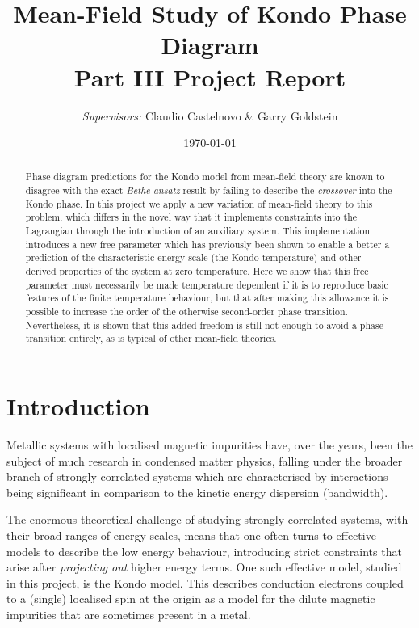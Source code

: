 \documentclass[12pt]{article}
\begin{document}
%

\title{
  Mean-Field Study of Kondo Phase Diagram \\
  \large Part III Project Report
}
\author{\textit{Supervisors:} Claudio Castelnovo \& Garry Goldstein}
\date{\today}

\maketitle

\begin{abstract}
Phase diagram predictions for the Kondo model from mean-field theory are known to disagree with the exact \textit{Bethe ansatz} result by failing to describe the \emph{crossover} into the Kondo phase. In this project we apply a new variation of mean-field theory to this problem, which differs in the novel way that it implements constraints into the Lagrangian through the introduction of an auxiliary system. This implementation introduces a new free parameter which has previously been shown to enable a better a prediction of the characteristic energy scale (the Kondo temperature) and other derived properties of the system at zero temperature. Here we show that this free parameter must necessarily be made temperature dependent if it is to reproduce basic features of the finite temperature behaviour, but that after making this allowance it is possible to increase the order of the otherwise second-order phase transition. Nevertheless, it is shown that this added freedom is still not enough to avoid a phase transition entirely, as is typical of other mean-field theories.
\end{abstract}

\section{Introduction}

Metallic systems with localised magnetic impurities have, over the years, been the subject of much research in condensed matter physics, falling under the broader branch of strongly correlated systems which are characterised by interactions being significant in comparison to the kinetic energy dispersion (bandwidth).

The enormous theoretical challenge of studying strongly correlated systems, with their broad ranges of energy scales, means that one often turns to effective models to describe the low energy behaviour, introducing strict constraints that arise after \textit{projecting out} higher energy terms. One such effective model, studied in this project, is the Kondo model. This describes conduction electrons coupled to a (single) localised spin at the origin as a model for the dilute magnetic impurities that are sometimes present in a metal.
\end{document}
